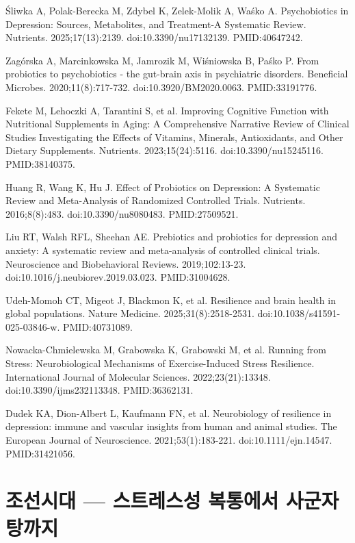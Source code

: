 \documentclass[12pt,oneside]{book}
\newcommand{\refend}{\endgroup\par}
\newcommand{\reff}[2]{\par\hangindent=7mm\hangafter=1\noindent[#1]\hspace{2mm}#2\par}
\begin{document}
\reff{59}{Śliwka A, Polak-Berecka M, Zdybel K, Zelek-Molik A, Waśko A. Psychobiotics in Depression: Sources, Metabolites, and Treatment-A Systematic Review. Nutrients. 2025;17(13):2139. doi:10.3390/nu17132139. PMID:40647242.}

\reff{60}{Zagórska A, Marcinkowska M, Jamrozik M, Wiśniowska B, Paśko P. From probiotics to psychobiotics - the gut-brain axis in psychiatric disorders. Beneficial Microbes. 2020;11(8):717-732. doi:10.3920/BM2020.0063. PMID:33191776.}

\reff{61}{Fekete M, Lehoczki A, Tarantini S, et al. Improving Cognitive Function with Nutritional Supplements in Aging: A Comprehensive Narrative Review of Clinical Studies Investigating the Effects of Vitamins, Minerals, Antioxidants, and Other Dietary Supplements. Nutrients. 2023;15(24):5116. doi:10.3390/nu15245116. PMID:38140375.}

\reff{62}{Huang R, Wang K, Hu J. Effect of Probiotics on Depression: A Systematic Review and Meta-Analysis of Randomized Controlled Trials. Nutrients. 2016;8(8):483. doi:10.3390/nu8080483. PMID:27509521.}

\reff{63}{Liu RT, Walsh RFL, Sheehan AE. Prebiotics and probiotics for depression and anxiety: A systematic review and meta-analysis of controlled clinical trials. Neuroscience and Biobehavioral Reviews. 2019;102:13-23. doi:10.1016/j.neubiorev.2019.03.023. PMID:31004628.}

\reff{64}{Udeh-Momoh CT, Migeot J, Blackmon K, et al. Resilience and brain health in global populations. Nature Medicine. 2025;31(8):2518-2531. doi:10.1038/s41591-025-03846-w. PMID:40731089.}

\reff{65}{Nowacka-Chmielewska M, Grabowska K, Grabowski M, et al. Running from Stress: Neurobiological Mechanisms of Exercise-Induced Stress Resilience. International Journal of Molecular Sciences. 2022;23(21):13348. doi:10.3390/ijms232113348. PMID:36362131.}

\reff{66}{Dudek KA, Dion-Albert L, Kaufmann FN, et al. Neurobiology of resilience in depression: immune and vascular insights from human and animal studies. The European Journal of Neuroscience. 2021;53(1):183-221. doi:10.1111/ejn.14547. PMID:31421056.}

\refend


\chapter{조선시대 — 스트레스성 복통에서 사군자탕까지}
\end{document}
